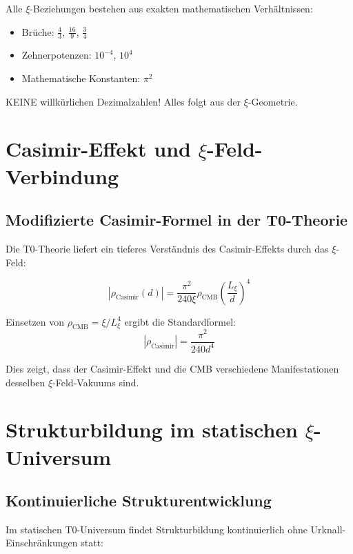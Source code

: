 	\begin{important}
		Alle $\xi$-Beziehungen bestehen aus exakten mathematischen Verhältnissen:
		\begin{itemize}
			\item Brüche: $\frac{4}{3}$, $\frac{16}{9}$, $\frac{3}{4}$
			\item Zehnerpotenzen: $10^{-4}$, $10^4$
			\item Mathematische Konstanten: $\pi^2$
		\end{itemize}
		KEINE willkürlichen Dezimalzahlen! Alles folgt aus der $\xi$-Geometrie.
	\end{important}
	
	\section{Casimir-Effekt und $\xi$-Feld-Verbindung}
	
	\subsection{Modifizierte Casimir-Formel in der T0-Theorie}
	
	Die T0-Theorie liefert ein tieferes Verständnis des Casimir-Effekts durch das $\xi$-Feld:
	
	\begin{equation}
		|\rho_{\text{Casimir}}(d)| = \frac{\pi^2}{240 \xi} \rho_{\text{CMB}} \left(\frac{L_\xi}{d}\right)^4
	\end{equation}
	
	Einsetzen von $\rho_{\text{CMB}} = \xi/L_\xi^4$ ergibt die Standardformel:
	\begin{equation}
		|\rho_{\text{Casimir}}| = \frac{\pi^2}{240 d^4}
	\end{equation}
	
	Dies zeigt, dass der Casimir-Effekt und die CMB verschiedene Manifestationen desselben $\xi$-Feld-Vakuums sind.
	
	\section{Strukturbildung im statischen $\xi$-Universum}
	
	\subsection{Kontinuierliche Strukturentwicklung}
	
	Im statischen T0-Universum findet Strukturbildung kontinuierlich ohne Urknall-Einschränkungen statt:
	
